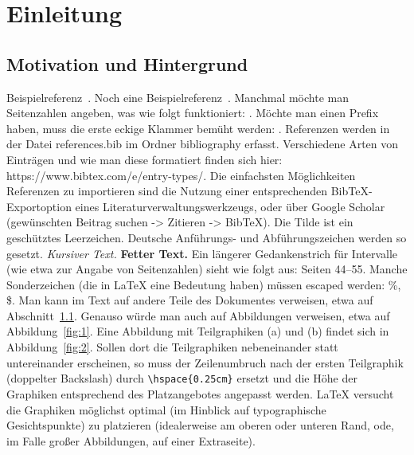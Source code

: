 \chapter{Einleitung}
\section{Motivation und Hintergrund}\label{sec:motivation}
Beispielreferenz~\cite{westerholt2023simulation}. Noch eine Beispielreferenz~\citep{westerholt2023simulation}. Manchmal möchte man Seitenzahlen angeben, was wie folgt funktioniert: \citep[][S.\,5]{westerholt2023simulation}. Möchte man einen Prefix haben, muss die erste eckige Klammer bemüht werden: \citep[siehe][]{westerholt2023simulation}. Referenzen werden in der Datei references.bib im Ordner bibliography erfasst. Verschiedene Arten von Einträgen und wie man diese formatiert finden sich hier: https://www.bibtex.com/e/entry-types/. Die einfachsten Möglichkeiten Referenzen zu importieren sind die Nutzung einer entsprechenden BibTeX-Exportoption eines Literaturverwaltungswerkzeugs, oder über Google Scholar (gewünschten Beitrag suchen -> Zitieren -> BibTeX). Die Tilde ist ein geschütztes Leerzeichen. \glqq Deutsche Anführungs- und Abführungszeichen werden so gesetzt\grqq{}. \textit{Kursiver Text.} \textbf{Fetter Text.} Ein längerer Gedankenstrich für Intervalle (wie etwa zur Angabe von Seitenzahlen) sieht wie folgt aus: Seiten 44--55. Manche Sonderzeichen (die in LaTeX eine Bedeutung haben) müssen escaped werden: \%, \$. Man kann im Text auf andere Teile des Dokumentes verweisen, etwa auf Abschnitt~\ref{sec:motivation}. Genauso würde man auch auf Abbildungen verweisen, etwa auf Abbildung~\ref{fig:1}. Eine Abbildung mit Teilgraphiken (a) und (b) findet sich in Abbildung~\ref{fig:2}. Sollen dort die Teilgraphiken nebeneinander statt untereinander erscheinen, so muss der Zeilenumbruch nach der ersten Teilgraphik (doppelter Backslash) durch \verb|\hspace{0.25cm}| ersetzt und die Höhe der Graphiken entsprechend des Platzangebotes angepasst werden. LaTeX versucht die Graphiken möglichst optimal (im Hinblick auf typographische Gesichtspunkte) zu platzieren (idealerweise am oberen oder unteren Rand, ode, im Falle großer Abbildungen, auf einer Extraseite).
